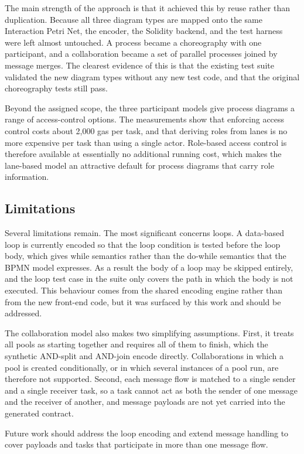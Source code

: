 \documentclass[runningheads]{llncs}
\begin{document}
The main strength of the approach is that it achieved this by reuse rather than duplication. Because all three diagram types are mapped onto the same Interaction Petri Net, the encoder, the Solidity backend, and the test harness were left almost untouched. A process became a choreography with one participant, and a collaboration became a set of parallel processes joined by message merges. The clearest evidence of this is that the existing test suite validated the new diagram types without any new test code, and that the original choreography tests still pass.

Beyond the assigned scope, the three participant models give process diagrams a range of access-control options. The measurements show that enforcing access control costs about 2{,}000 gas per task, and that deriving roles from lanes is no more expensive per task than using a single actor. Role-based access control is therefore available at essentially no additional running cost, which makes the lane-based model an attractive default for process diagrams that carry role information.

\subsection{Limitations}
Several limitations remain. The most significant concerns loops. A data-based loop is currently encoded so that the loop condition is tested before the loop body, which gives while semantics rather than the do-while semantics that the BPMN model expresses. As a result the body of a loop may be skipped entirely, and the loop test case in the suite only covers the path in which the body is not executed. This behaviour comes from the shared encoding engine rather than from the new front-end code, but it was surfaced by this work and should be addressed.

The collaboration model also makes two simplifying assumptions. First, it treats all pools as starting together and requires all of them to finish, which the synthetic AND-split and AND-join encode directly. Collaborations in which a pool is created conditionally, or in which several instances of a pool run, are therefore not supported. Second, each message flow is matched to a single sender and a single receiver task, so a task cannot act as both the sender of one message and the receiver of another, and message payloads are not yet carried into the generated contract.

Future work should address the loop encoding and extend message handling to cover payloads and tasks that participate in more than one message flow.
\end{document}
